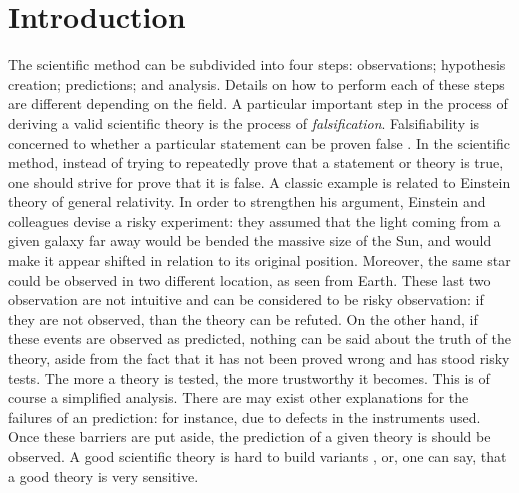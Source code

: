 \chapter{Introduction}

The scientific method can be subdivided into four steps: observations; hypothesis creation; predictions; and analysis. Details on how to perform each of these steps are different depending on the field. A particular important step in the process of deriving a valid scientific theory is the process of \emph{falsification}. Falsifiability  is concerned to whether a particular statement can be proven false \cite{KarlPopper}. In the scientific method, instead of trying to repeatedly prove that a statement or theory is true, one should strive for prove that it is false. A classic example is related to Einstein theory of general relativity. In order to strengthen his argument, Einstein and colleagues devise a risky experiment: they assumed that the light coming from a given galaxy far away would be bended the massive size of the Sun, and would make it appear shifted in relation to its original position. Moreover, the same star could be observed in two different location, as seen from Earth. These last two observation are not intuitive and can be considered to be risky observation: if they are not observed, than the theory can be refuted. On the other hand, if these events are observed as predicted, nothing can be said about the truth of the theory, aside from the fact that it has not been proved wrong and has stood risky tests. The more a theory is tested, the more trustworthy it becomes. 
This is of course a simplified analysis. There are may exist other explanations for the failures of an prediction: for instance, due to defects in the instruments used. Once these barriers are put aside, the prediction of a given theory is should be observed. A good scientific theory is hard to build variants \cite{The-beginning-of-infinity}, or, one can say, that a good theory is very sensitive.

